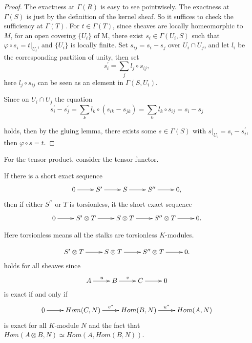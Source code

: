 \documentclass[twoside]{article}
\begin{document}
\begin{proof}
  The exactness  at $\Gamma(R)$ is easy to see pointwisely.  The exactness at $\Gamma(S)$ is just by the definition of the kernel sheaf. So it suffices to check the sufficiency at $\Gamma(T)$. For $t\in \Gamma(T)$, since sheaves are locally homeomorphic to $M$, for an open covering $\{U_i\}$ of M, there exist $s_i\in \Gamma({U_i},S)$ such that $\varphi\circ s_i=t|_{U_i}$, and $\{U_i\}$ is locally finite. Set $s_{ij}=s_i-s_j$ over $U_i\cap U_j$, and let $l_i$ be the corresponding partition of unity, then  set $$
  s_i^\prime=\sum_jl_j\circ s_{ij},
  $$
  here $l_j\circ s_{ij}$ can be seen as an element in $\Gamma(S,U_i)$.

  Since on $U_i\cap U_j$ the equation $$
  s_i^\prime-s_j^\prime=\sum_k l_k\circ (s_{ik}-s_{jk})=\sum_kl_k\circ s_{ij}=s_i-s_j
  $$

  holds, then by the gluing lemma, there exists  some $s\in \Gamma(S)$ with $s|_{U_i}=s_i-s_i^\prime$, then $\varphi\circ s=t$.
\end{proof}

For the tensor product,  consider the tensor functor.

\begin{proposition}
If there is a  short exact sequence
   \begin{equation*}
  \xymatrix{
  0\ar[r]&S^\prime\ar[r]&S\ar[r]&S^{\prime\prime}\ar[r]&0,\\
  }
\end{equation*}
  then if either $S^{\prime\prime}$ or $T$ is torsionless, it  the short exact sequence \begin{equation*}
  \xymatrix{
  0\ar[r]&S^\prime\otimes T\ar[r]&S\otimes T\ar[r]&S^{\prime\prime}\otimes T\ar[r]&0.\\
  }
\end{equation*}

Here torsionless means all the stalks are torsionless $K$-modules.
\end{proposition}

\begin{equation*}
  \xymatrix{
  S^\prime\otimes T\ar[r]&S\otimes T\ar[r]&S^{\prime\prime}\otimes T\ar[r]&0.\\
  }\end{equation*}
   holds for all sheaves since
   \begin{equation*}
  \xymatrix{
 A\ar[r]^u&B\ar[r]^v&C\ar[r]&0\\
  }\end{equation*}
   is exact if and only if \begin{equation*}
  \xymatrix{
 0\ar[r]&Hom(C,N)\ar[r]^{v^*}&Hom(B,N)\ar[r]^{u^*}&Hom(A,N)\\
 }\end{equation*}
   is exact for all  $K$-module $N$ and the fact that $Hom(A\otimes B,N)\simeq Hom(A,Hom(B,N))$.
\end{document}
